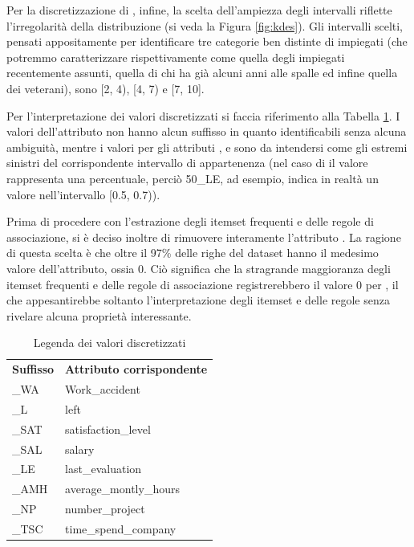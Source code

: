 \documentclass[a4paper]{article}
\let\texttt\path
\begin{document}
Per la discretizzazione di \texttt{time_spend_company}, infine, la scelta dell'ampiezza degli intervalli riflette l'irregolarità della distribuzione (si veda la Figura \ref{fig:kdes}). Gli intervalli scelti, pensati appositamente per identificare tre categorie ben distinte di impiegati (che potremmo caratterizzare rispettivamente come quella degli impiegati recentemente assunti, quella di chi ha già alcuni anni alle spalle ed infine quella dei veterani), sono [2, 4), [4, 7) e [7, 10].

Per l'interpretazione dei valori discretizzati si faccia riferimento alla Tabella \ref{tab:legend}. I valori dell'attributo  non hanno alcun suffisso in quanto identificabili senza alcuna ambiguità, mentre i valori per gli attributi ,  e  sono da intendersi come gli estremi sinistri del corrispondente intervallo di appartenenza (nel caso di  il valore rappresenta una percentuale, perciò 50\_LE, ad esempio, indica in realtà un valore nell'intervallo [0.5, 0.7)). 

Prima di procedere con l'estrazione degli itemset frequenti e delle regole di associazione, si è deciso inoltre di rimuovere interamente l'attributo . La ragione di questa scelta è che oltre il 97\% delle righe del dataset hanno il medesimo valore dell'attributo, ossia 0. Ciò significa che la stragrande maggioranza degli itemset frequenti e delle regole di associazione registrerebbero il valore 0 per , il che appesantirebbe soltanto l'interpretazione degli itemset e delle regole senza rivelare alcuna proprietà interessante.

\begin{table}[h]
\centering
\begingroup
\setlength{\tabcolsep}{10pt} %
\renewcommand{\arraystretch}{1.5} %
\begin{tabularx}{\textwidth}{|X|X|}
\hline
{\textbf{Suffisso}} & {\textbf{Attributo corrispondente}} \\
\_WA & Work\_accident \\
\_L & left \\
\_SAT & satisfaction\_level \\
\_SAL & salary \\
\_LE & last\_evaluation \\
\_AMH & average\_montly\_hours \\
\_NP & number\_project \\
\_TSC & time\_spend\_company \\
\hline
\end{tabularx}
\endgroup
\caption{Legenda dei valori discretizzati}
\label{tab:legend}
\end{table}
\end{document}
